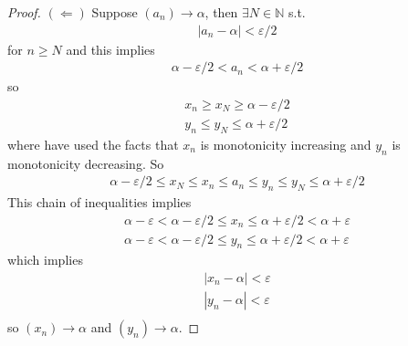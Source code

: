 \begin{enumerate}[label=(\alph*)]
\begin{proof}
        $(\Leftarrow)$ Suppose $(a_n) \rightarrow \alpha$, then 
        $\exists N \in \mathbb{N}$ s.t. 
        \begin{align*}
            |a_n - \alpha| < \varepsilon /2
        \end{align*} 
        for $n \geq N$ and this implies
        \begin{align*}
            \alpha - \varepsilon /2 < a_n < \alpha + \varepsilon /2
        \end{align*}
        so 
        \begin{gather*}
            x_n \geq x_N \geq \alpha - \varepsilon /2 \\
            y_n \leq y_N \leq \alpha + \varepsilon /2
        \end{gather*}
        where have used the facts that $x_n$ is monotonicity increasing and
        $y_n$ is monotonicity decreasing.
        So 
        \begin{align*}
            \alpha - \varepsilon /2 \leq x_N \leq x_n \leq a_n \leq y_n \leq y_N \leq \alpha + \varepsilon /2
        \end{align*}
        This chain of inequalities implies 
        \begin{gather*}
            \alpha - \varepsilon  < \alpha - \varepsilon /2 \leq x_n \leq \alpha + \varepsilon /2 < \alpha + \varepsilon \\
            \alpha - \varepsilon < \alpha - \varepsilon /2 \leq y_n \leq \alpha + \varepsilon /2 < \alpha + \varepsilon
        \end{gather*}
        which implies
        \begin{gather*}
            |x_n - \alpha| < \varepsilon \\ 
            |y_n - \alpha| < \varepsilon \\ 
        \end{gather*}
        so $(x_n)\rightarrow \alpha$ and $(y_n)\rightarrow \alpha$.
    \end{proof}
\end{enumerate}


